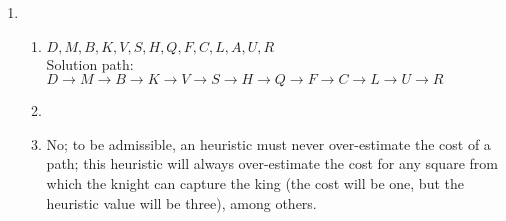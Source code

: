 \documentclass{article}
\begin{document}
\begin{enumerate}
    \item
    \begin{enumerate}
        \item $D, M, B, K, V, S, H, Q, F, C, L, A, U, R$\\
            Solution path: $D{\rightarrow}M{\rightarrow}B{\rightarrow}K{\rightarrow}V{\rightarrow}S{\rightarrow}H{\rightarrow}Q{\rightarrow}F{\rightarrow}C{\rightarrow}L{\rightarrow}U{\rightarrow}R$

        \item%

        \item No; to be admissible, an heuristic must never over-estimate the cost of a path; this heuristic will always over-estimate the cost for any square from which the knight can capture the king (the cost will be one, but the heuristic value will be three), among others.


\end{enumerate}
\end{enumerate}
\end{document}
